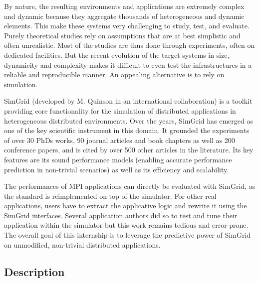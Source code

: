 \documentclass[a4paper,11pt]{article}
\begin{document}
By nature, the resulting environments and applications are extremely
complex and dynamic because they aggregate thousands of heterogeneous
and dynamic elements. This make these systems very challenging to
study, test, and evaluate.  Purely theoretical studies rely on
assumptions that are at best simplistic and often unrealistic. Most of
the studies are thus done through experiments, often on dedicated
facilities.
%
But the recent evolution of the target systems in size, dynamicity and
complexity makes it difficult to even test the infrastructures in a
reliable and reproducible manner. An appealing alternative is to rely
on simulation.


SimGrid (developed by M. Quinson in an international collaboration) is
a toolkit providing core functionality for the simulation of
distributed applications in heterogeneous distributed environments.
Over the years, SimGrid has emerged as one of the key scientific
instrument in this domain. It grounded the experiments of over 30 PhDs
works, 90 journal articles and book chapters as well as 200 conference
papers, and is cited by over 500 other articles in the literature. Its
key features are its sound performance models (enabling accurate
performance prediction in non-trivial scenarios) as well as its
efficiency and scalability.

The performances of MPI applications can directly be evaluated with
SimGrid, as the standard is reimplemented on top of the simulator. For
other real applications, users have to extract the applicative logic
and rewrite it using the SimGrid interfaces. Several application
authors did so to test and tune their application within the simulator
but this work remains tedious and error-prone. The overall goal of
this internship is to leverage the predictive power of SimGrid on
unmodified, non-trivial distributed applications.

\subsection*{Description}

\end{document}
